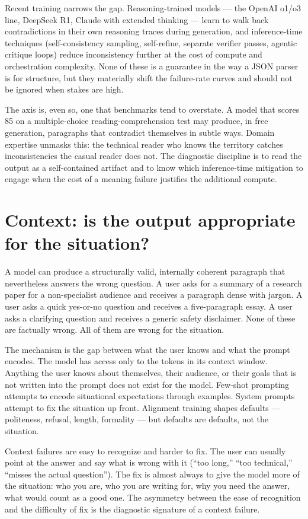 \documentclass[11pt,a4paper]{article}
\begin{document}
Recent training narrows the gap. Reasoning-trained models --- the
OpenAI o1/o3 line, DeepSeek R1, Claude with extended thinking ---
learn to walk back contradictions in their own reasoning traces
during generation, and inference-time techniques (self-consistency
sampling, self-refine, separate verifier passes, agentic critique
loops) reduce inconsistency further at the cost of compute and
orchestration complexity. None of these is a guarantee in the way
a JSON parser is for structure, but they materially shift the
failure-rate curves and should not be ignored when stakes are high.

The axis is, even so, one that benchmarks tend to overstate. A
model that scores 85 on a multiple-choice reading-comprehension
test may produce, in free generation, paragraphs that contradict
themselves in subtle ways. Domain expertise unmasks this: the
technical reader who knows the territory catches inconsistencies
the casual reader does not. The diagnostic discipline is to read
the output as a self-contained artifact and to know which
inference-time mitigation to engage when the cost of a meaning
failure justifies the additional compute.

\section*{Context: is the output appropriate for the situation?}

A model can produce a structurally valid, internally coherent
paragraph that nevertheless answers the wrong question. A user
asks for a summary of a research paper for a non-specialist
audience and receives a paragraph dense with jargon. A user asks a
quick yes-or-no question and receives a five-paragraph essay. A
user asks a clarifying question and receives a generic safety
disclaimer. None of these are factually wrong. All of them are
wrong for the situation.

The mechanism is the gap between what the user knows and what the
prompt encodes. The model has access only to the tokens in its
context window. Anything the user knows about themselves, their
audience, or their goals that is not written into the prompt does
not exist for the model. Few-shot prompting attempts to encode
situational expectations through examples. System prompts attempt
to fix the situation up front. Alignment training shapes defaults
--- politeness, refusal, length, formality --- but defaults are
defaults, not the situation.

Context failures are easy to recognize and harder to fix. The user
can usually point at the answer and say what is wrong with it
(``too long,'' ``too technical,'' ``misses the actual question'').
The fix is almost always to give the model more of the situation:
who you are, who you are writing for, why you need the answer,
what would count as a good one. The asymmetry between the ease of
recognition and the difficulty of fix is the diagnostic signature
of a context failure.
\end{document}
